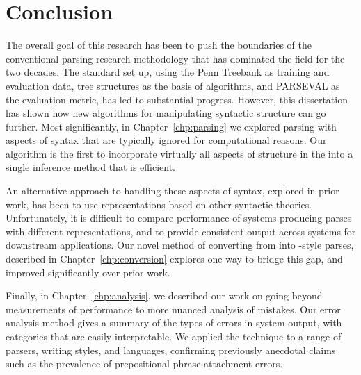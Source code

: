 \chapter{Conclusion}

The overall goal of this research has been to push the boundaries of the conventional parsing research methodology that has dominated the field for the two decades.
The standard set up, using the Penn Treebank as training and evaluation data, tree structures as the basis of algorithms, and PARSEVAL as the evaluation metric, has led to substantial progress.
However, this dissertation has shown how new algorithms for manipulating syntactic structure can go further.
Most significantly, in Chapter~\ref{chp:parsing} we explored parsing with aspects of syntax that are typically ignored for computational reasons.
Our algorithm is the first to incorporate virtually all aspects of structure in the \ptb into a single inference method that is efficient.

An alternative approach to handling these aspects of syntax, explored in prior work, has been to use representations based on other syntactic theories.
Unfortunately, it is difficult to compare performance of systems producing parses with different representations, and to provide consistent output across systems for downstream applications.
Our novel method of converting from \ccg into \ptb-style parses, described in Chapter~\ref{chp:conversion} explores one way to bridge this gap, and improved significantly over prior work.

Finally, in Chapter~\ref{chp:analysis}, we described our work on going beyond measurements of performance to more nuanced analysis of mistakes.
Our error analysis method gives a summary of the types of errors in system output, with categories that are easily interpretable.
We applied the technique to a range of parsers, writing styles, and languages, confirming previously anecdotal claims such as the prevalence of prepositional phrase attachment errors.

